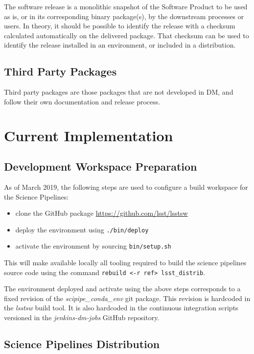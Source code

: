 The software release is a monolithic snapshot of the Software Product to be used as is, or in its corresponding binary package(s), by the downstream processes or users.
In theory, it should be possible to identify the release with a checksum calculated automatically on the delivered package.
That checksum can be used to identify the release installed in an environment, or included in a distribution.


\subsection{Third Party Packages}

Third party packages are those packages that are not developed in DM, and follow their own documentation and release process.


\newpage
\section{Current Implementation} \label{sec:actual}

\subsection{Development Workspace Preparation} \label{sec:envset} 
As of March 2019, the following steps are used to configure a build workspace for the Science Pipelines:

\begin{itemize}
\item clone the GitHub package \url{https://github.com/lsst/lsstsw}
\item deploy the environment using \texttt{./bin/deploy}
\item activate the environment by sourcing \texttt{bin/setup.sh}
\end{itemize}

This will make available locally all tooling required to build the science pipelines source code using the command \texttt{rebuild <-r ref> lsst\_distrib}.

The environment deployed and activate using the above steps corresponds to a fixed revision of the \textit{scipipe\_conda\_env} git package.
This revision is hardcoded in the \textit{lsstsw} build tool. It is also hardcoded in the continuous integration scripts versioned in the \textit{jenkins-dm-jobs} GitHub repository.


\subsection{Science Pipelines Distribution} \label{sec:distrib}

